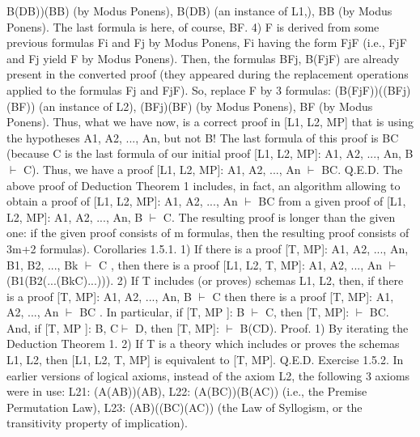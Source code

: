 B\IMPLIES (D\IMPLIES B))\IMPLIES (B\IMPLIES B) (by Modus Ponens),
B\IMPLIES (D\IMPLIES B) (an instance of L1,),
B\IMPLIES B (by Modus Ponens).
The last formula is here, of course, B\IMPLIES F.
4) F is derived from some previous formulas Fi and Fj by Modus Ponens, Fi having the form Fj\IMPLIES F (i.e.,
Fj\IMPLIES F and Fj yield F by Modus Ponens). Then, the formulas
B\IMPLIES Fj,
B\IMPLIES (Fj\IMPLIES F)
are already present in the converted proof (they appeared during the replacement operations applied to the
formulas Fj and Fj\IMPLIES F). So, replace F by 3 formulas:
(B\IMPLIES (Fj\IMPLIES F))\IMPLIES ((B\IMPLIES Fj)\IMPLIES (B\IMPLIES F)) (an instance of L2),
(B\IMPLIES Fj)\IMPLIES (B\IMPLIES F) (by Modus Ponens),
B\IMPLIES F (by Modus Ponens).
Thus, what we have now, is a correct proof in [L1, L2, MP] that is using the hypotheses A1, A2, ..., An, but
not B! The last formula of this proof is B\IMPLIES C (because C is the last formula of our initial proof [L1, L2,
MP]: A1, A2, ..., An, B \(\vdash\) C). Thus, we have a proof [L1, L2, MP]: A1, A2, ..., An \(\vdash\) B\IMPLIES C. Q.E.D.
The above proof of Deduction Theorem 1 includes, in fact, an algorithm allowing to obtain a proof of
[L1, L2, MP]: A1, A2, ..., An \(\vdash\) B\IMPLIES C from a given proof of [L1, L2, MP]: A1, A2, ..., An, B \(\vdash\) C. The
resulting proof is longer than the given one: if the given proof consists of m formulas, then the resulting
proof consists of 3m+2 formulas).
Corollaries 1.5.1. 1) If there is a proof [T, MP]: A1, A2, ..., An, B1, B2, ..., Bk \(\vdash\) C , then there is a proof
[L1, L2, T, MP]: A1, A2, ..., An \(\vdash\) (B1\IMPLIES (B2\IMPLIES (...\IMPLIES (Bk\IMPLIES C)...))).
2) If T includes (or proves) schemas L1, L2, then, if there is a proof [T, MP]: A1, A2, ..., An, B \(\vdash\) C then
there is a proof [T, MP]: A1, A2, ..., An \(\vdash\) B\IMPLIES C .
In particular, if [T, MP ]: B \(\vdash\) C, then [T, MP]: \(\vdash\) B\IMPLIES C.
And, if [T, MP ]: B, C\(\vdash\) D, then [T, MP]: \(\vdash\) B\IMPLIES (C\IMPLIES D).
Proof. 1) By iterating the Deduction Theorem 1.
2) If T is a theory which includes or proves the schemas L1, L2, then [L1, L2, T, MP] is equivalent to [T,
MP]. Q.E.D.
Exercise 1.5.2. In earlier versions of logical axioms, instead of the axiom L2, the following 3 axioms
were in use:
L21: (A\IMPLIES (A\IMPLIES B))\IMPLIES (A\IMPLIES B),
L22: (A\IMPLIES (B\IMPLIES C))\IMPLIES (B\IMPLIES (A\IMPLIES C)) (i.e., the Premise Permutation Law),
L23: (A\IMPLIES B)\IMPLIES ((B\IMPLIES C)\IMPLIES (A\IMPLIES C)) (the Law of Syllogism, or the transitivity property of implication).

